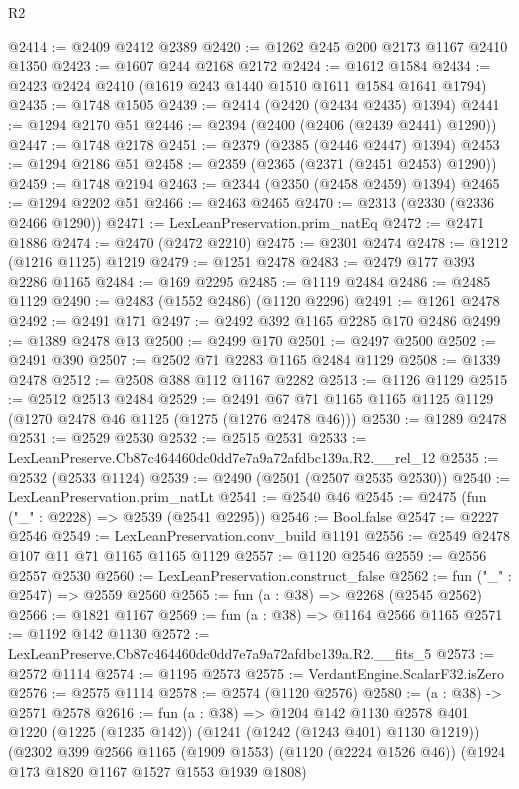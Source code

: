 \begin{lexlean}{R2}
\begin{coremodule}
@2414 := @2409 @2412 @2389
@2420 := @1262 @245 @200 @2173 @1167 @2410 @1350
@2423 := @1607 @244 @2168 @2172
@2424 := @1612 @1584
@2434 := @2423 @2424 @2410 (@1619 @243 @1440 @1510 @1611 @1584 @1641 @1794)
@2435 := @1748 @1505
@2439 := @2414 (@2420 (@2434 @2435) @1394)
@2441 := @1294 @2170 @51
@2446 := @2394 (@2400 (@2406 (@2439 @2441) @1290))
@2447 := @1748 @2178
@2451 := @2379 (@2385 (@2446 @2447) @1394)
@2453 := @1294 @2186 @51
@2458 := @2359 (@2365 (@2371 (@2451 @2453) @1290))
@2459 := @1748 @2194
@2463 := @2344 (@2350 (@2458 @2459) @1394)
@2465 := @1294 @2202 @51
@2466 := @2463 @2465
@2470 := @2313 (@2330 (@2336 @2466 @1290))
@2471 := LexLeanPreservation.prim_natEq
@2472 := @2471 @1886
@2474 := @2470 (@2472 @2210)
@2475 := @2301 @2474
@2478 := @1212 (@1216 @1125) @1219
@2479 := @1251 @2478
@2483 := @2479 @177 @393 @2286 @1165
@2484 := @169 @2295
@2485 := @1119 @2484
@2486 := @2485 @1129
@2490 := @2483 (@1552 @2486) (@1120 @2296)
@2491 := @1261 @2478
@2492 := @2491 @171
@2497 := @2492 @392 @1165 @2285 @170 @2486
@2499 := @1389 @2478 @13
@2500 := @2499 @170
@2501 := @2497 @2500
@2502 := @2491 @390
@2507 := @2502 @71 @2283 @1165 @2484 @1129
@2508 := @1339 @2478
@2512 := @2508 @388 @112 @1167 @2282
@2513 := @1126 @1129
@2515 := @2512 @2513 @2484
@2529 := @2491 @67 @71 @1165 @1165 @1125 @1129 (@1270 @2478 @46 @1125 (@1275 (@1276 @2478 @46)))
@2530 := @1289 @2478
@2531 := @2529 @2530
@2532 := @2515 @2531
@2533 := LexLeanPreserve.Cb87c464460dc0dd7e7a9a72afdbc139a.R2.__rel_12
@2535 := @2532 (@2533 @1124)
@2539 := @2490 (@2501 (@2507 @2535 @2530))
@2540 := LexLeanPreservation.prim_natLt
@2541 := @2540 @46
@2545 := @2475 (fun ("_" : @2228) => @2539 (@2541 @2295))
@2546 := Bool.false
@2547 := @2227 @2546
@2549 := LexLeanPreservation.conv_build @1191
@2556 := @2549 @2478 @107 @11 @71 @1165 @1165 @1129
@2557 := @1120 @2546
@2559 := @2556 @2557 @2530
@2560 := LexLeanPreservation.construct_false
@2562 := fun ("_" : @2547) => @2559 @2560
@2565 := fun (a : @38) => @2268 (@2545 @2562)
@2566 := @1821 @1167
@2569 := fun (a : @38) => @1164 @2566 @1165
@2571 := @1192 @142 @1130
@2572 := LexLeanPreserve.Cb87c464460dc0dd7e7a9a72afdbc139a.R2.__fits_5
@2573 := @2572 @1114
@2574 := @1195 @2573
@2575 := VerdantEngine.ScalarF32.isZero
@2576 := @2575 @1114
@2578 := @2574 (@1120 @2576)
@2580 := (a : @38) -> @2571 @2578
@2616 := fun (a : @38) =>
  @1204
    @142
    @1130
    @2578
    @401
    @1220
    (@1225 (@1235 @142))
    (@1241 (@1242 (@1243 @401) @1130 @1219))
    (@2302
      @399
      @2566
      @1165
      (@1909 @1553)
      (@1120 (@2224 @1526 @46))
      (@1924 @173 @1820 @1167 @1527 @1553 @1939 @1808)

\end{coremodule}
\end{lexlean}
